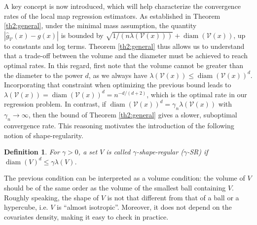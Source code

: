 \documentclass[paper=a4, fontsize=11pt]{scrartcl}
\newcommand{\diam}{\operatorname{diam}}
\newtheorem{definition}[theorem]{Definition}
\begin{document}
A key concept is now introduced, which will help characterize the convergence rates of the local map regression estimators. As established in Theorem \ref{th2:general}, under the minimal mass assumption, the quantity $ |\hat g_{\mathcal V}(x) - g (x) |$ is bounded by
 $  \sqrt { 1 / ( n \lambda (\mathcal V (x)) )    }   +   \diam (\mathcal V (x))  $, up to constants and log terms. Theorem \ref{th2:general} thus allows us to understand that a trade-off between the volume and the diameter must be achieved to reach optimal rates.
In this regard, first note that the volume cannot be greater than the diameter to the power $d$, as we always have $ \lambda (\mathcal V(x) )  \leq \diam ( \mathcal V(x) )^d $. %
Incorporating that constraint when optimizing the previous bound 
leads to $\lambda (\mathcal V(x) ) = \diam ( \mathcal V(x) )^d = n^{-d/(d+2)}$, which is the optimal rate in our regression problem. In contrast, if $ \diam ( \mathcal V(x) )^d = \gamma_n \lambda (\mathcal V(x) )   $ with $\gamma_n \to \infty$, then the bound of Theorem \ref{th2:general} gives a slower, suboptimal convergence rate. This reasoning motivates the introduction of the following notion of shape-regularity.



\begin{definition}\label{def:gamma_regular}
For $\gamma>0 $, a set $ V $ is called $\gamma$-shape-regular ($\gamma$-SR) if
$\diam(V)^d \leq \gamma \lambda (V)$.
\end{definition}
\noindent The previous condition can be interpreted as a volume condition: the volume of $V$ should be of the same order as the volume of the smallest ball containing $V$. Roughly speaking, the shape of $V$ is not that different from that of a ball or a hypercube, i.e. $V$ is ``almost isotropic''. Moreover, it does not depend on the covariates density, making it easy to check in practice. 
 
\end{document}
